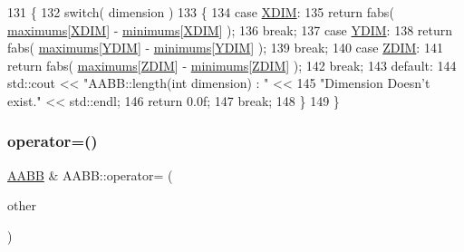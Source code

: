 \begin{DoxyCode}
131 \{
132     \textcolor{keywordflow}{switch}( dimension )
133     \{
134         \textcolor{keywordflow}{case} \hyperlink{class_a_a_b_b_aac753e0248d039329b25b38d0ed9cd4f}{XDIM}:
135             \textcolor{keywordflow}{return} fabs( \hyperlink{class_a_a_b_b_a1289c3a2e5c7a98f90d5bcdb8251a06f}{maximums}[\hyperlink{class_a_a_b_b_aac753e0248d039329b25b38d0ed9cd4f}{XDIM}] - \hyperlink{class_a_a_b_b_aaf1ec35e5c0258cd57e65429f93c14a2}{minimums}[\hyperlink{class_a_a_b_b_aac753e0248d039329b25b38d0ed9cd4f}{XDIM}] );
136             \textcolor{keywordflow}{break};
137         \textcolor{keywordflow}{case} \hyperlink{class_a_a_b_b_a5192e3bdf0789cdc9e5f643b401e5b10}{YDIM}:
138             \textcolor{keywordflow}{return} fabs( \hyperlink{class_a_a_b_b_a1289c3a2e5c7a98f90d5bcdb8251a06f}{maximums}[\hyperlink{class_a_a_b_b_a5192e3bdf0789cdc9e5f643b401e5b10}{YDIM}] - \hyperlink{class_a_a_b_b_aaf1ec35e5c0258cd57e65429f93c14a2}{minimums}[\hyperlink{class_a_a_b_b_a5192e3bdf0789cdc9e5f643b401e5b10}{YDIM}] );
139             \textcolor{keywordflow}{break};
140         \textcolor{keywordflow}{case} \hyperlink{class_a_a_b_b_a3e78cd8baa6ab6199afb2cb014e0db62}{ZDIM}:
141             \textcolor{keywordflow}{return} fabs( \hyperlink{class_a_a_b_b_a1289c3a2e5c7a98f90d5bcdb8251a06f}{maximums}[\hyperlink{class_a_a_b_b_a3e78cd8baa6ab6199afb2cb014e0db62}{ZDIM}] - \hyperlink{class_a_a_b_b_aaf1ec35e5c0258cd57e65429f93c14a2}{minimums}[\hyperlink{class_a_a_b_b_a3e78cd8baa6ab6199afb2cb014e0db62}{ZDIM}] );
142             \textcolor{keywordflow}{break};
143         \textcolor{keywordflow}{default}:
144             std::cout << \textcolor{stringliteral}{"AABB::length(int dimension) : "} <<
145                      \textcolor{stringliteral}{"Dimension Doesn't exist."} << std::endl;
146             \textcolor{keywordflow}{return} 0.0f;
147             \textcolor{keywordflow}{break};
148     \}
149 \}
\end{DoxyCode}
\mbox{\label{class_a_a_b_b_a672a17a4a8ad2d0ea52ed7e73cd9a6a4}} 
\subsubsection{\texorpdfstring{operator=()}{operator=()}}
{\footnotesize\ttfamily \hyperlink{class_a_a_b_b}{A\+A\+BB} \& A\+A\+B\+B\+::operator= (\begin{DoxyParamCaption}\item[{const \hyperlink{class_a_a_b_b}{A\+A\+BB} \&}]{other }\end{DoxyParamCaption})}



